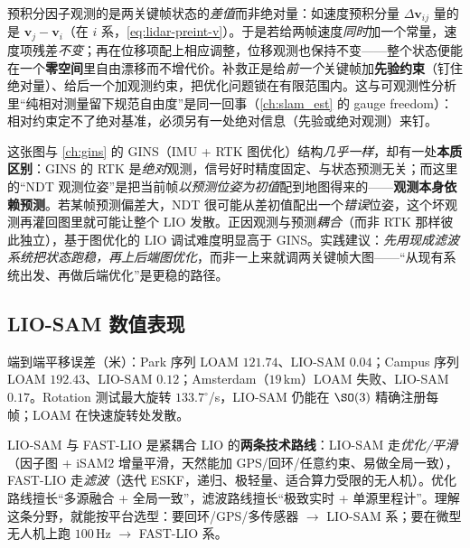 \begin{insight}\label{ins:lidar-preint-zerospace}
预积分因子观测的是两关键帧状态的\emph{差值}而非绝对量\cite{gao2023slamad}：如速度预积分量 $\Delta\mathbf{v}_{ij}$ 量的是 $\mathbf{v}_j-\mathbf{v}_i$（在 $i$ 系，\cref{eq:lidar-preint-v}）。于是若给两帧速度\emph{同时}加一个常量，速度项残差\emph{不变}；再在位移项配上相应调整，位移观测也保持不变——整个状态便能在一个\textbf{零空间}里自由漂移而不增代价。补救正是给\emph{前一个}关键帧加\textbf{先验约束}（钉住绝对量）、给后一个加观测约束，把优化问题锁在有限范围内。这与可观测性分析里“纯相对测量留下规范自由度”是同一回事（\cref{ch:slam_est} 的 gauge freedom）：相对约束定不了绝对基准，必须另有一处绝对信息（先验或绝对观测）来钉。
\end{insight}

\begin{insight}\label{ins:lidar-preint-debug}
这张图与 \cref{ch:gins} 的 GINS（IMU + RTK 图优化）结构\emph{几乎一样}，却有一处\textbf{本质区别}\cite{gao2023slamad}：GINS 的 RTK 是\emph{绝对}观测，信号好时精度固定、与状态预测无关；而这里的“NDT 观测位姿”是把当前帧\emph{以预测位姿为初值}配到地图得来的——\textbf{观测本身依赖预测}。若某帧预测偏差大，NDT 很可能从差初值配出一个\emph{错误}位姿，这个坏观测再灌回图里就可能让整个 LIO 发散。正因观测与预测\emph{耦合}（而非 RTK 那样彼此独立），基于图优化的 LIO 调试难度明显高于 GINS。实践建议：\emph{先用现成滤波系统把状态跑稳，再上后端图优化}，而非一上来就调两关键帧大图——“从现有系统出发、再做后端优化”是更稳的路径。
\end{insight}

\subsection{LIO-SAM 数值表现}
端到端平移误差（米）\cite{shan2020liosam}：Park 序列 LOAM $121.74$、LIO-SAM $0.04$；Campus 序列 LOAM $192.43$、LIO-SAM $0.12$；Amsterdam（$19$\,km）LOAM 失败、LIO-SAM $0.17$。Rotation 测试最大旋转 $133.7^\circ$/s，LIO-SAM 仍能在 $\SO(3)$ 精确注册每帧；LOAM 在快速旋转处发散。

\begin{insight}
LIO-SAM 与 FAST-LIO 是紧耦合 LIO 的\textbf{两条技术路线}：LIO-SAM 走\emph{优化/平滑}（因子图 + iSAM2 增量平滑，天然能加 GPS/回环/任意约束、易做全局一致），FAST-LIO 走\emph{滤波}（迭代 ESKF，递归、极轻量、适合算力受限的无人机）。优化路线擅长“多源融合 + 全局一致”，滤波路线擅长“极致实时 + 单源里程计”。理解这条分野，就能按平台选型：要回环/GPS/多传感器 $\to$ LIO-SAM 系；要在微型无人机上跑 $100$\,Hz $\to$ FAST-LIO 系。
\end{insight}

